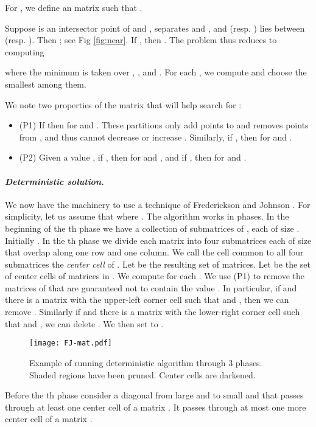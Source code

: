 \documentclass[11pt]{myclass}
\begin{document}
For , we define an  matrix  such that .  

Suppose  is an intersector point of  and ,  separates  and , and  (resp. ) lies between  (resp. ).  Then ; see Fig \ref{fig:near}.  
If , then .  
The problem thus reduces to computing 

where the minimum is taken over , , and .  For each , we compute  and choose the smallest among them.  

We note two properties of the matrix  that will help search for :

\begin{itemize}
\item{(P1)} 
If  then  for  and .  These partitions only add points to  and removes points from , and thus cannot decrease  or increase .  
Similarly, if , then  for  and . 
\item{(P2)} Given a value , if , then  for  and , and if , then  for  and .
\end{itemize}


\paragraph{\textbf{\emph{Deterministic solution.}}}
We now have the machinery to use a technique of Frederickson and Johnson \cite{FJ82}.  
For simplicity, let us assume that  where .  The algorithm works in  phases.
In the beginning of the th phase we have a collection  of  submatrices of , each of size .  Initially .  In the th phase we divide each matrix  into four submatrices each of size  that overlap along one row and one column.  We call the cell common to all four submatrices the \emph{center cell} of .  Let  be the resulting set of matrices.  Let  be the set of center cells of matrices in .  We compute  for each .  We use (P1) to remove the matrices of  that are guaranteed not to contain the value .  
In particular, if  and there is a matrix  with the upper-left corner cell  such that  and , then we can remove .  
Similarly if  and there is a matrix  with the lower-right corner cell  such that  and , we can delete . 
We then set  to . 

\begin{figure}[h]
\center
\texttt{[image: FJ-mat.pdf]}
\caption{\label{fig:FJ-mat}
Example of running deterministic algorithm through 3 phases.  Shaded regions have been pruned.  Center cells are darkened.  
}
\end{figure}

\begin{lemma}
Before the th phase consider a diagonal from large  and  to small  and  that passes through at least one center cell of a matrix .  It passes through at most one more center cell of a matrix .  
\label{lem:diag-center}
\end{lemma}
\end{document}
